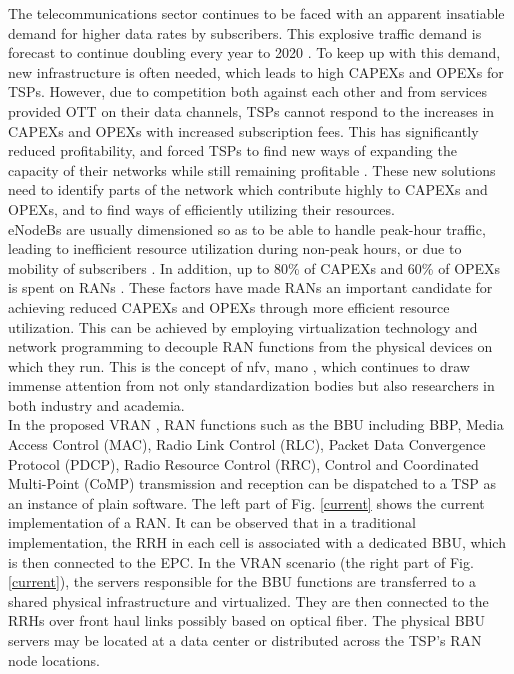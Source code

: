 \documentclass[conference]{IEEEtran}
\begin{document}
The telecommunications sector continues to be faced with an apparent insatiable demand for higher data rates by subscribers. This explosive traffic demand is forecast to continue doubling every year to 2020 \cite{nfv}. To keep up with this demand, new infrastructure is often needed, which leads to high \acp{CAPEX} and \acp{OPEX} for \acp{TSP}. However, due to competition both against each other and from services provided \ac{OTT} on their data channels, \acp{TSP} cannot respond to the increases in \acp{CAPEX} and \acp{OPEX} with increased subscription fees. This has significantly reduced profitability, and forced \acp{TSP} to find new ways of expanding the capacity of their networks while still remaining profitable \cite{MijumbiNFV15}. These new solutions need to identify parts of the network which contribute highly to \acp{CAPEX} and \acp{OPEX}, and to find ways of efficiently utilizing their resources.\\
\indent \acp{eNodeB} are usually dimensioned so as to be able to handle peak-hour traffic, leading to inefficient resource utilization during non-peak hours, or due to mobility of subscribers \cite{ChinaMobile}. In addition, up to 80\% of \acp{CAPEX} and 60\% of \acp{OPEX} is spent on \acp{RAN} \cite{ChinaMobile}. These factors have made \acp{RAN} an important candidate for achieving reduced \acp{CAPEX} and \acp{OPEX} through more efficient resource utilization. This can be achieved by employing virtualization technology and network programming to decouple \ac{RAN} functions from the physical devices on which they run. This is the concept of \ac{nfv, mano} \cite{MijumbiNFV15}, which continues to draw immense attention from not only standardization bodies but also researchers in both industry and academia.\\
\indent In the proposed \ac{VRAN} \cite{ETSIUseCases}, \ac{RAN} functions such as the \ac{BBU}  including \ac{BBP}, Media Access Control (MAC), Radio Link Control (RLC), Packet Data Convergence Protocol (PDCP), Radio Resource Control (RRC), Control and Coordinated Multi-Point (CoMP) transmission and reception  can be dispatched to a \ac{TSP} as an instance of plain software. The left part of Fig. \ref{current} shows the current implementation of a \ac{RAN}. It can be observed that in a traditional implementation, the \ac{RRH} in each cell is associated with a dedicated \ac{BBU}, which is then connected to the \ac{EPC}. In the \ac{VRAN} scenario (the right part of Fig. \ref{current}), the servers responsible for the \ac{BBU} functions are transferred to a shared physical infrastructure and virtualized. They are then connected to the \acp{RRH} over front haul links  possibly based on optical fiber. The physical \ac{BBU} servers may be located at a data center or distributed across the \ac{TSP}'s \ac{RAN} node locations.\\
\end{document}
